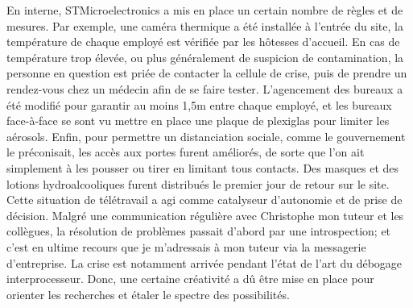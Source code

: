 En interne, STMicroelectronics a mis en place un certain nombre de règles et
de mesures. Par exemple, une caméra thermique a été installée à l'entrée du
site, la température de chaque employé est vérifiée par les hôtesses
d'accueil. En cas de température trop élevée, ou plus généralement de
suspicion de contamination, la personne en question est priée de contacter la
cellule de crise, puis de prendre un rendez-vous chez un médecin afin de se
faire tester. L'agencement des bureaux a été modifié pour garantir au moins
1,5m entre chaque employé, et les bureaux face-à-face se sont vu mettre en
place une plaque de plexiglas pour limiter les aérosols. Enfin, pour permettre
un distanciation sociale, comme le gouvernement le préconisait, les accès aux
portes furent améliorés, de sorte que l'on ait simplement à les pousser ou
tirer en limitant tous contacts. Des masques et des lotions hydroalcooliques
furent distribués le premier jour de retour sur le site. \\

Cette situation de télétravail a agi comme catalyseur d'autonomie et de prise
de décision. Malgré une communication régulière avec Christophe mon tuteur et
les collègues, la résolution de problèmes passait d'abord par une
introspection; et c'est en ultime recours que je m'adressais à mon tuteur via
la messagerie d'entreprise. La crise est notamment arrivée pendant l'état de
l'art du débogage interprocesseur. Donc, une certaine créativité a dû être
mise en place pour orienter les recherches et étaler le spectre des
possibilités.


